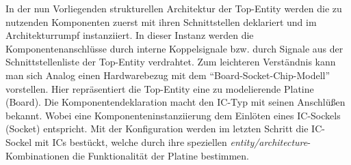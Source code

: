 \documentclass{article}
\begin{document}
\vspace{10mm}
In der nun Vorliegenden strukturellen Architektur der Top-Entity werden die zu nutzenden Komponenten
zuerst mit ihren Schnittstellen deklariert und im Architekturrumpf instanziiert. In dieser Instanz
werden die Komponentenanschlüsse durch interne Koppelsignale bzw. durch Signale aus der
Schnittstellenliste der Top-Entity verdrahtet.
Zum leichteren Verständnis kann man sich Analog einen Hardwarebezug mit dem 
"`Board-Socket-Chip-Modell"'\cite{Perry} vorstellen. Hier repräsentiert die Top-Entity eine zu 
modelierende Platine (Board). Die Komponentendeklaration macht den IC-Typ mit seinen Anschlüßen 
bekannt. Wobei eine Komponenteninstanziierung dem Einlöten eines IC-Sockels (Socket) entspricht.
Mit der Konfiguration werden im letzten Schritt die IC-Sockel mit ICs bestückt, welche durch ihre 
speziellen \emph{entity/architecture}-Kombinationen die Funktionalität der Platine bestimmen.
\cite{Reichardt}
\end{document}
